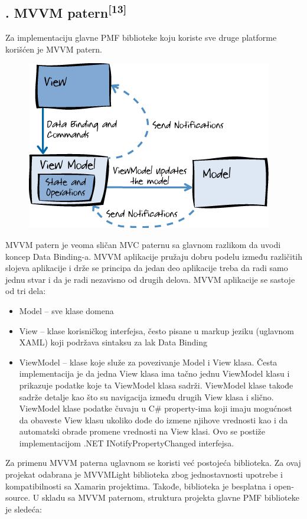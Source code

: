 \documentclass[a4paper]{article}
\newcommand\liststyleLix{%
\renewcommand\labelitemi{•}
\renewcommand\labelitemii{◦}
\renewcommand\labelitemiii{${\blacksquare}$}
\renewcommand\labelitemiv{•}
}
\begin{document}
\subsection[7.3. MVVM patern[13{]}]{. MVVM
patern\textsuperscript{[13]}}
\hypertarget{RefHeadingToc4291813786090}{}Za implementaciju glavne PMF
biblioteke koju koriste sve druge platforme korišćen je MVVM patern.



\begin{figure}
\centering
\includegraphics[width=107.42mm,height=73.82mm]{msc-img36.png}
\end{figure}
MVVM patern je veoma sličan MVC paternu sa glavnom razlikom da uvodi
koncep Data Binding-a. MVVM aplikacije pružaju dobru podelu između
različitih slojeva aplikacije i drže se principa da jedan deo
aplikacije treba da radi samo jednu stvar i da je radi nezavisno od
drugih delova. MVVM aplikacije se sastoje od tri dela:

\liststyleLix
\begin{itemize}
\item Model – sve klase domena
\item View – klase korisničkog interfejsa, često pisane u markup jeziku
(uglavnom XAML) koji podržava sintaksu za lak Data Binding
\item ViewModel – klase koje služe za povezivanje Model i View klasa.
Česta implementacija je da jedna View klasa ima tačno jednu ViewModel
klasu i prikazuje podatke koje ta ViewModel klasa sadrži. ViewModel
klase takođe sadrže detalje kao što su navigacija između drugih View
klasa i slično. ViewModel klase podatke čuvaju u C\# property-ima koji
imaju mogućnost da obaveste View klasu ukoliko dođe do izmene njihove
vrednosti kao i da automatski obrade promene vrednosti na View klasi.
Ovo se postiže implementacijom .NET INotifyPropertyChanged interfejsa.
\end{itemize}
Za primenu MVVM paterna uglavnom se koristi već postojeća biblioteka. Za
ovaj projekat odabrana je MVVMLight biblioteka zbog jednostavnosti
upotrebe i kompatibilnosti sa Xamarin projektima. Takođe, biblioteka je
besplatna i open-source. U skladu sa MVVM paternom, struktura projekta
glavne PMF biblioteke je sledeća:
\end{document}
